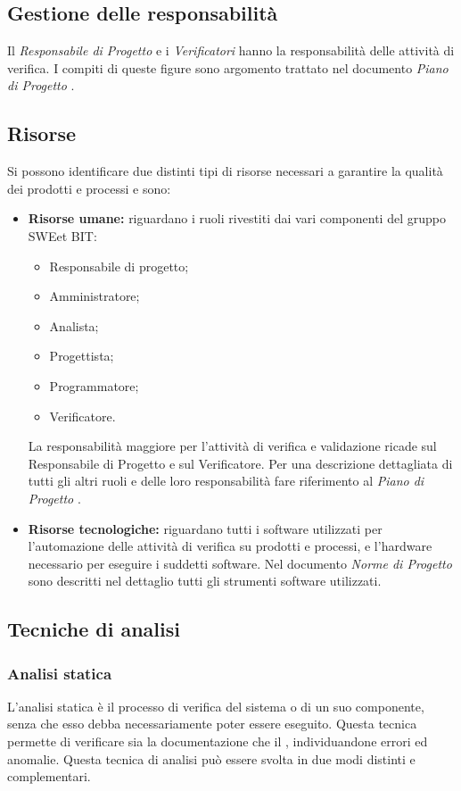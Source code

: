   \subsection{Gestione delle responsabilità}
    Il \emph{Responsabile di Progetto} e i \emph{Verificatori} hanno la responsabilità delle attività di verifica.
    I compiti di queste figure sono argomento trattato nel documento \emph{Piano di Progetto \VersionePP{}}.

  \subsection{Risorse}
    Si possono identificare due distinti tipi di risorse necessari a garantire la qualità dei prodotti e processi e sono:
    \begin{itemize}
      \item \textbf{Risorse umane:} riguardano i ruoli rivestiti dai vari componenti del gruppo SWEet BIT:
      \begin{itemize}
        \item Responsabile di progetto;
        \item Amministratore;
        \item Analista;
        \item Progettista;
        \item Programmatore;
        \item Verificatore.
      \end{itemize}

		La responsabilità maggiore per l’attività di verifica e validazione ricade sul Responsabile di Progetto e sul Verificatore. Per una descrizione dettagliata di tutti gli altri ruoli e delle loro responsabilità fare riferimento al \emph{Piano di Progetto \VersionePP{}}.      

      \item \textbf{Risorse tecnologiche:} riguardano tutti i software utilizzati per l'automazione delle attività di verifica su prodotti e processi, e l'hardware necessario per eseguire i suddetti software. Nel documento \emph{Norme di Progetto \VersioneNP{}} sono descritti nel dettaglio tutti gli strumenti software utilizzati.
    \end{itemize}
    
\subsection{Tecniche di analisi}
\subsubsection{Analisi statica}
    L'analisi statica è il processo di verifica del sistema o di un suo componente, senza che esso debba necessariamente poter essere eseguito.
    Questa tecnica permette di verificare sia la documentazione che il , individuandone errori ed anomalie. Questa tecnica di analisi può essere svolta in due modi distinti e complementari.
    
